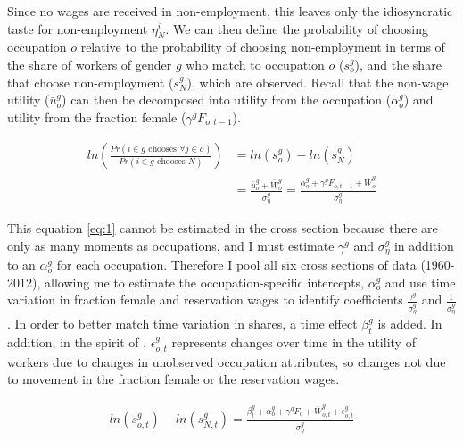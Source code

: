 \documentclass[12pt]{article}
\begin{document}
Since no wages are received in non-employment, this leaves only the idiosyncratic taste for non-employment $\eta^i_N$. We can then define the probability of choosing occupation $o$ relative to the probability of choosing non-employment in terms of the share of workers of gender $g$ who match to occupation $o$ ($s^g_o$), and  the share that choose non-employment ($s^g_N$), which are observed. Recall that the non-wage utility ($\bar{u}^{g}_o$) can then be decomposed into utility from the occupation ($\alpha^{g}_o$) and utility from the fraction female ($\gamma^g F_{o,t-1}$).



\begin{equation} \label{eq:1}
\begin{split}
ln \left( \frac{Pr(i \in g \text{ chooses } \forall j \in o)}{ Pr(i \in g \text{ chooses }N)} \right) &= ln(s^g_o) - ln(s^g_N) \\
 &= \frac{\bar{u}^{g}_o + \bar{W}^g_o}{ \sigma^g_{\eta} } = \frac{\alpha^{g}_o + \gamma^g F_{o,t-1}  + \bar{W}^g_o}{ \sigma^g_{\eta} } 
 \end{split}
\end{equation}


This equation \ref{eq:1} cannot be estimated in the cross section because there are only as many moments as occupations, and I must estimate $\gamma^g$ and $\sigma^g_{\eta}$ in addition to an $\alpha^g_o$ for each occupation. Therefore I pool all six cross sections of data (1960-2012), allowing me to estimate the occupation-specific intercepts, $\alpha^g_o$ and use time variation in fraction female and reservation wages to identify coefficients $\frac{\gamma^g}{\sigma^g_{\eta}}$ and $\frac{1}{\sigma^g_{\eta}}$. In order to better match time variation in shares, a time effect $\beta^g_t$ is added. In addition, in the spirit of , $\epsilon^g_{o,t}$ represents changes over time in the utility of workers due to changes in unobserved occupation attributes, so changes not due to movement in the fraction female or the reservation wages.

\begin{align*}
ln(s^g_{o,t}) - ln(s^g_{N,t}) =   \frac{ \beta^g_t + \alpha^g_o +  \gamma^g F_{o} +  \bar{W}^g_{o,t} + \epsilon^g_{o,t}}{\sigma^g_{\eta}}  \\
\end{align*}
\end{document}
